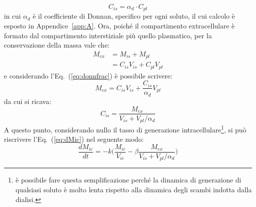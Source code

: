 \begin{equation}
	C_{is} = \alpha_d\cdot C_{pl}
	\label{eq:donnfrac}
\end{equation}
in cui $\alpha_d$ è il coefficiente di Donnan, specifico per ogni soluto, il cui calcolo è esposto in Appendice~\ref{app:A}.
Ora, poiché il compartimento extracellulare è formato dal compartimento interstiziale più quello plasmatico, per la conservazione della massa vale che:
\begin{align*}
	M_{ex} &= M_{is} + M_{pl} \\
	             &= C_{is} V_{is} + C_{pl} V_{pl}
\end{align*}
e considerando l'Eq.~(\ref{eq:donnfrac}) è possibile scrivere:
\begin{equation}\label{eq:meno_ovvia}
	M_{ex} = C_{is} V_{is} + \frac{C_{is}}{\alpha_d} V_{pl}
\end{equation}
da cui si ricava:
\begin{equation*}
	C_{is} = \frac{M_{ex}}{V_{is} + V_{pl}/\alpha_d}
\end{equation*}
A questo punto, considerando nullo il tasso di generazione intracellulare\footnote{è possibile fare questa semplificazione perché la dinamica di generazione di qualsiasi soluto è molto lenta rispetto alla dinamica degli scambi indotta dalla dialisi.}, si può riscrivere l'Eq.~(\ref{eq:dMic}) nel seguente modo:
\begin{equation}\label{eq:dmic}
	\frac{dM_{ic}}{dt} = - k \biggl(\frac{M_{ic}}{V_{ic}} - \beta \frac{M_{ex}}{V_{is} + V_{pl}/\alpha_d}\biggr)
\end{equation}

